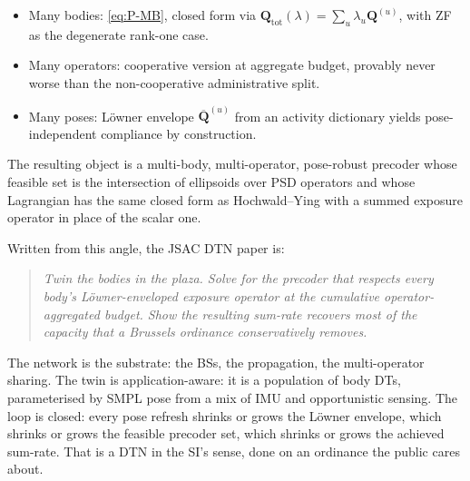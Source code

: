 \documentclass[11pt,a4paper]{article}
\theoremstyle{definition}
\newcommand{\Q}{\mathbf{Q}}
\newcommand{\Qbar}{\overline{\mathbf{Q}}}
\begin{document}
\begin{itemize}[leftmargin=1.6em,itemsep=2pt]
\item Many bodies: \eqref{eq:P-MB}, closed form via
$\Q_{\mathrm{tot}}(\lambda)=\sum_u\lambda_u\Q^{(u)}$, with ZF as the
degenerate rank-one case.
\item Many operators: cooperative version at aggregate budget,
provably never worse than the non-cooperative administrative split.
\item Many poses: Löwner envelope $\Qbar^{(u)}$ from an activity
dictionary yields pose-independent compliance by construction.
\end{itemize}

The resulting object is a multi-body, multi-operator,
pose-robust precoder whose feasible set is the intersection of
ellipsoids over PSD operators and whose Lagrangian has the same
closed form as Hochwald--Ying with a summed exposure operator in
place of the scalar one.

Written from this angle, the JSAC DTN paper is:

\begin{quote}
\textit{Twin the bodies in the plaza. Solve for the precoder that
respects every body's Löwner-enveloped exposure operator at the
cumulative operator-aggregated budget. Show the resulting sum-rate
recovers most of the capacity that a Brussels ordinance
conservatively removes.}
\end{quote}

The network is the substrate: the BSs, the propagation, the
multi-operator sharing. The twin is application-aware: it is a
population of body DTs, parameterised by SMPL pose from a mix of IMU
and opportunistic sensing. The loop is closed: every pose refresh
shrinks or grows the Löwner envelope, which shrinks or grows the
feasible precoder set, which shrinks or grows the achieved sum-rate.
That is a DTN in the SI's sense, done on an ordinance the public
cares about.
\end{document}
